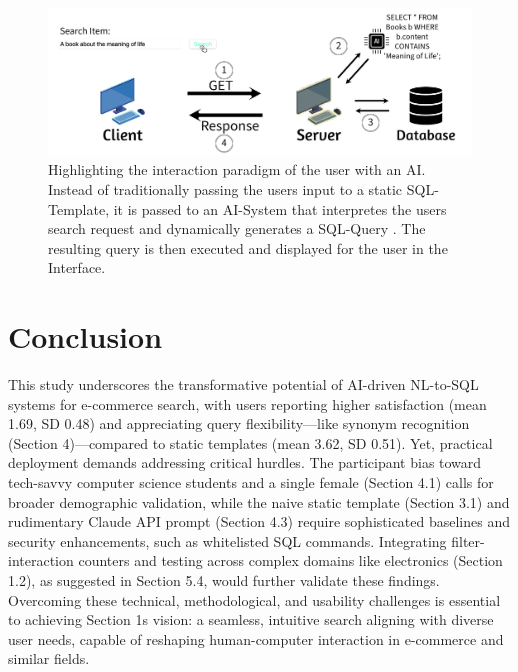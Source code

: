 \documentclass[manuscript,review]{acmart}
\begin{document}
\begin{figure}[h]
  \includegraphics[width=\textwidth]{images/front_image}
  \caption{Highlighting the interaction paradigm of the user with an AI. Instead
  of traditionally passing the users input to a static SQL-Template, it is passed 
  to an AI-System that interpretes the users search request and dynamically generates a SQL-Query
  . The resulting query is then executed and displayed for the user in the Interface.}
\end{figure}












\section{Conclusion}
This study underscores the transformative potential of AI-driven NL-to-SQL systems 
for e-commerce search, with users reporting higher satisfaction (mean 1.69, SD 0.48) 
and appreciating query flexibility—like synonym recognition (Section 4)—compared to static 
templates (mean 3.62, SD 0.51). Yet, practical deployment demands addressing critical hurdles. 
The participant bias toward tech-savvy computer science students and a single female (Section 4.1) calls 
for broader demographic validation, while the naive static template (Section 3.1) and 
rudimentary Claude API prompt (Section 4.3) require sophisticated baselines and security 
enhancements, such as whitelisted SQL commands. Integrating filter-interaction counters and 
testing across complex domains like electronics (Section 1.2), as suggested in Section 5.4, 
would further validate these findings. Overcoming these technical, methodological, and usability 
challenges is essential to achieving Section 1s vision: a seamless, intuitive search aligning 
with diverse user needs, capable of reshaping human-computer interaction in e-commerce and similar fields.
\end{document}
